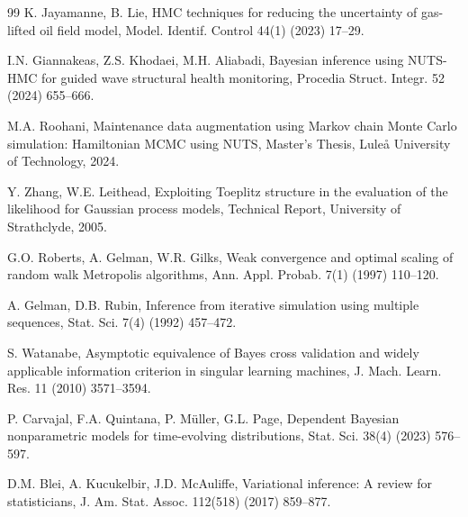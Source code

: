 \documentclass[a4paper,fleqn,longmktitle]{cas-sc}
\begin{document}
\begin{thebibliography}{99}
K. Jayamanne, B. Lie, HMC techniques for reducing the uncertainty of gas-lifted oil field model, Model. Identif. Control 44(1) (2023) 17--29.





I.N. Giannakeas, Z.S. Khodaei, M.H. Aliabadi, Bayesian inference using NUTS-HMC for guided wave structural health monitoring, Procedia Struct. Integr. 52 (2024) 655--666.





M.A. Roohani, Maintenance data augmentation using Markov chain Monte Carlo simulation: Hamiltonian MCMC using NUTS, Master's Thesis, Lule\r{a} University of Technology, 2024.





Y. Zhang, W.E. Leithead, Exploiting Toeplitz structure in the evaluation of the likelihood for Gaussian process models, Technical Report, University of Strathclyde, 2005.





G.O. Roberts, A. Gelman, W.R. Gilks, Weak convergence and optimal scaling of random walk Metropolis algorithms, Ann. Appl. Probab. 7(1) (1997) 110--120.




A. Gelman, D.B. Rubin, Inference from iterative simulation using multiple sequences, Stat. Sci. 7(4) (1992) 457--472.





S. Watanabe, Asymptotic equivalence of Bayes cross validation and widely applicable information criterion in singular learning machines, J. Mach. Learn. Res. 11 (2010) 3571--3594.





P. Carvajal, F.A. Quintana, P. M\"uller, G.L. Page, Dependent Bayesian nonparametric models for time-evolving distributions, Stat. Sci. 38(4) (2023) 576--597.





D.M. Blei, A. Kucukelbir, J.D. McAuliffe, Variational inference: A review for statisticians, J. Am. Stat. Assoc. 112(518) (2017) 859--877.






\end{thebibliography}
\end{document}

